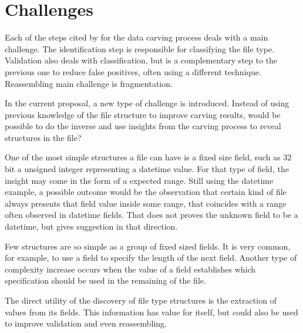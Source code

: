 \section{Challenges}

Each of the steps cited by \cite{ali_review_2018} for the data carving process deals with a main challenge. The identification step is responsible for classifying the file type. Validation also deals with classification, but is a complementary step to the previous one to reduce false positives, often using a different technique. Reassembling main challenge is fragmentation.

In the current proposal, a new type of challenge is introduced. Instead of using previous knowledge of the file structure to improve carving results, would be possible to do the inverse and use insights from the carving process to reveal structures in the file?

One of the most simple structures a file can have is a fixed size field, such as 32 bit a unsigned integer representing a datetime value. For that type of field, the insight may come in the form of a expected range. Still using the datetime example, a possible outcome would be the observation that certain kind of file always presents that field value inside some range, that coincides with a range often observed in datetime fields. That does not proves the unknown field to be a datetime, but gives suggestion in that direction.

Few structures are so simple as a group of fixed sized fields. It is very common, for example, to use a field to specify the length of the next field. Another type of complexity increase occurs when the value of a field establishes which specification should be used in the remaining of the file.

The direct utility of the discovery of file type structures is the extraction of values from its fields. This information has value for itself, but could also be used to improve validation and even reassembling. 
